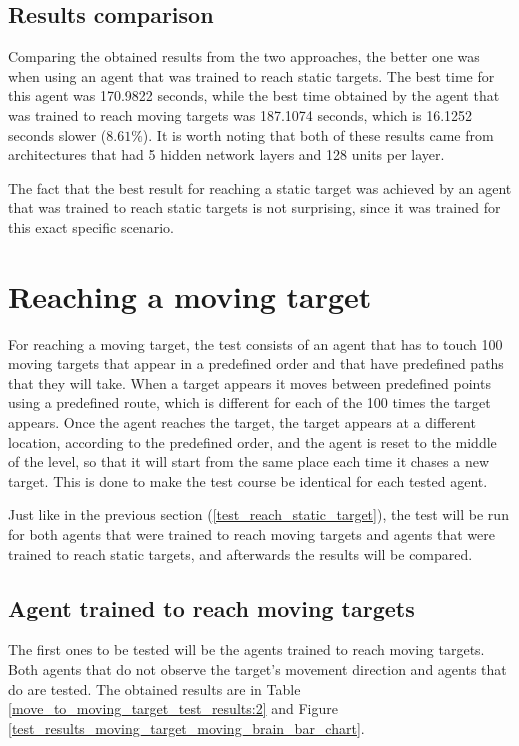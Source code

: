 \subsection{Results comparison}
Comparing the obtained results from the two approaches, the better one was when using an agent that was trained to reach static targets. The best time for this agent was 170.9822 seconds, while the best time obtained by the agent that was trained to reach moving targets was 187.1074 seconds, which is 16.1252 seconds slower ($8.61\%$). It is worth noting that both of these results came from architectures that had 5 hidden network layers and 128 units per layer.

The fact that the best result for reaching a static target was achieved by an agent that was trained to reach static targets is not surprising, since it was trained for this exact specific scenario.



\section{Reaching a moving target} \label{test_reach_moving_target}

For reaching a moving target, the test consists of an agent that has to touch 100 moving targets that appear in a predefined order and that have predefined paths that they will take. When a target appears it moves between predefined points using a predefined route, which is different for each of the 100 times the target appears. Once the agent reaches the target, the target appears at a different location, according to the predefined order, and the agent is reset to the middle of the level, so that it will start from the same place each time it chases a new target. This is done to make the test course be identical for each tested agent.

Just like in the previous section (\ref{test_reach_static_target}), the test will be run for both agents that were trained to reach moving targets and agents that were trained to reach static targets, and afterwards the results will be compared.


\subsection{Agent trained to reach moving targets}

The first ones to be tested will be the agents trained to reach moving targets. Both agents that do not observe the target's movement direction and agents that do are tested. The obtained results are in Table \ref{move_to_moving_target_test_results:2} and Figure \ref{test_results_moving_target_moving_brain_bar_chart}. 

